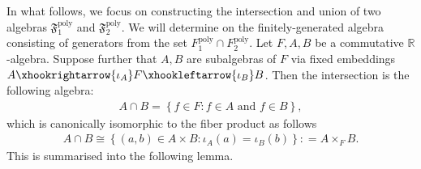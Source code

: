 \documentclass[11pt]{amsart}
\theoremstyle{definition}
\theoremstyle{plain}
\theoremstyle{conclusion}
\begin{document}
 In what follows, we focus on constructing the intersection and union of two algebras $\mathfrak{F}_1^{\mathrm{poly}}$ and $\mathfrak{F}_2^{\mathrm{poly}}$. %
 We will determine on the finitely-generated algebra consisting of generators from the set $F_1^{\mathrm{poly}} \cap  F_2^{\mathrm{poly}}$. Let $F,A, B$ be a commutative $\mathbb{R}$-algebra. Suppose further that $A,B$ are subalgebras of $F$ via fixed embeddings $  A \xhookrightarrow{\iota_A} F    \xhookleftarrow{\iota_B} B$. Then the intersection is the following algebra: \begin{align*}
    A \cap B = \left\{ f \in F: f \in A \text{ and } f \in B \right\},
\end{align*} which is canonically isomorphic to the fiber product as follows \begin{align}
    A \cap B \cong \left\{(a,b) \in A \times B : \iota_A (a) = \iota_B(b)\right\} : = A \times_F B. \label{eq:intersection}
\end{align}  This is summarised into the following lemma.
\end{document}
